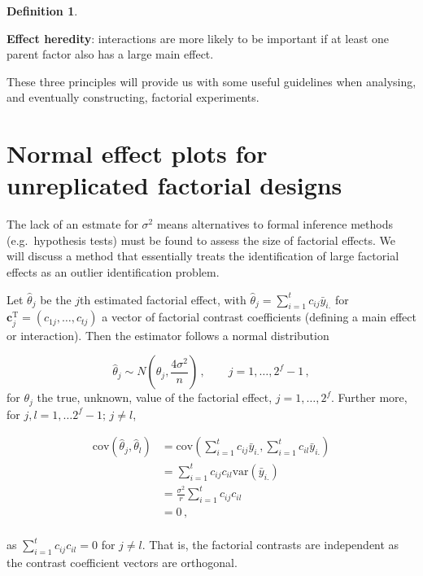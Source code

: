 \documentclass[
]{book}
\theoremstyle{definition}
\newtheorem{definition}{Definition}[chapter]
\theoremstyle{definition}
\theoremstyle{definition}
\theoremstyle{definition}
\theoremstyle{remark}
\begin{document}
\begin{definition}
\protect\hypertarget{def:effect-heredity}{}\label{def:effect-heredity}

\textbf{Effect heredity}: interactions are more likely to be important if at least one parent factor also has a large main effect.

\end{definition}

These three principles will provide us with some useful guidelines when analysing, and eventually constructing, factorial experiments.

\hypertarget{unreplicated-normal-plots}{%
\section{Normal effect plots for unreplicated factorial designs}\label{unreplicated-normal-plots}}

The lack of an estmate for \(\sigma^2\) means alternatives to formal inference methods (e.g.~hypothesis tests) must be found to assess the size of factorial effects. We will discuss a method that essentially treats the identification of large factorial effects as an outlier identification problem.

Let \(\hat{\theta}_j\) be the \(j\)th estimated factorial effect, with \(\hat{\theta}_j = \sum_{i=1}^tc_{ij}\bar{y}_{i.}\) for \(\boldsymbol{c}_j^{\mathrm{T}} = (c_{1j}, \ldots, c_{tj})\) a vector of factorial contrast coefficients (defining a main effect or interaction). Then the estimator follows a normal distribution

\[
\hat{\theta}_j \sim N\left(\theta_j, \frac{4\sigma^2}{n}\right)\,,\qquad j = 1, \ldots, 2^f-1\,,
\]
for \(\theta_j\) the true, unknown, value of the factorial effect, \(j = 1,\ldots, 2^f\). Further more, for \(j, l = 1, \ldots 2^f-1; \, j\ne l\),

\begin{align*}
\mbox{cov}(\hat{\theta}_j, \hat{\theta}_l) & =  \mbox{cov}\left(\sum_{i=1}^tc_{ij}\bar{y}_{i.}, \sum_{i=1}^tc_{il}\bar{y}_{i.}\right) \\
& = \sum_{i=1}^tc_{ij}c_{il}\mbox{var}(\bar{y}_{i.}) \\
& = \frac{\sigma^2}{r} \sum_{i=1}^tc_{ij}c_{il} \\
& = 0\,, \\
\end{align*}

as \(\sum_{i=1}^tc_{ij}c_{il} = 0\) for \(j\ne l\). That is, the factorial contrasts are independent as the contrast coefficient vectors are orthogonal.
\end{document}
